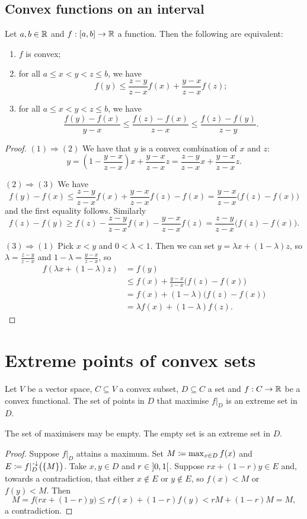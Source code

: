 \subsection{Convex functions on an interval}
\begin{proposition}
Let $a,b\in \mathbb{R}$ and $f: \interval{a,b}\to \R$ a function. Then the following are equivalent:
\begin{enumerate}
\item $f$ is convex;
\item for all $a \leq x<y<z \leq b$, we have
\[ f(y) \leq \frac{z-y}{z-x}f(x) + \frac{y-x}{z-x}f(z); \]
\item for all $a \leq x<y<z \leq b$, we have
\[ \frac{f(y)-f(x)}{y-x} \leq \frac{f(z)-f(x)}{z-x} \leq \frac{f(z)-f(y)}{z-y}. \]
\end{enumerate}
\end{proposition}
\begin{proof}
$(1) \Rightarrow (2)$ We have that $y$ is a convex combination of $x$ and $z$:
\[ y = \left(1 - \frac{y-x}{z-x}\right)x + \frac{y-x}{z-x}z =  \frac{z-y}{z-x}x + \frac{y-x}{z-x}z. \]

$(2) \Rightarrow (3)$ We have
\[ f(y) - f(x) \leq \frac{z-y}{z-x}f(x) + \frac{y-x}{z-x}f(z) - f(x) = \frac{y-x}{z-x}\big(f(z)-f(x)\big) \]
and the first equality follows. Similarly
\[ f(z) - f(y) \geq f(z) - \frac{z-y}{z-x}f(x) - \frac{y-x}{z-x}f(z) = \frac{z-y}{z-x}\big(f(z)-f(x)\big). \]

$(3) \Rightarrow (1)$ Pick $x<y$ and $0<\lambda< 1$. Then we can set $y = \lambda x + (1-\lambda)z$, so $\lambda = \frac{z-y}{z-x}$ and $1-\lambda = \frac{y-x}{z-x}$, so
\begin{align*}
f(\lambda x + (1-\lambda)z) &= f(y) \\
&\leq f(x) + \frac{y-x}{z-x}\big(f(z)-f(x)\big) \\
&= f(x) + (1-\lambda)\big(f(z) - f(x)\big) \\
&= \lambda f(x) + (1-\lambda)f(z).
\end{align*}
\end{proof}

\section{Extreme points of convex sets}

\begin{lemma} \label{extremePointsConvexFunctionExtremePointsDomain}
Let $V$ be a vector space, $C\subseteq V$ a convex subset, $D\subseteq C$ a set and $f: C\to \mathbb{R}$ be a convex functional.
The set of points in $D$ that maximise $f|_D$ is an extreme set in $D$.
\end{lemma}
The set of maximisers may be empty. The empty set is an extreme set in $D$.
\begin{proof}
Suppose $f|_D$ attains a maximum. Set $M \coloneqq \max_{x\in D}f(x)$ and $E \coloneqq f|_D^{{\text{\hspace{0.15em}-}\downarrow}}\big(\{M\}\big)$. Take $x,y\in D$ and $r\in \interval[o]{0,1}$. Suppose $rx + (1-r)y\in E$ and, towards a contradiction, that either $x \notin E$ or $y \notin E$, so $f(x)<M$ or $f(y)<M$. Then
\[ M = f\big(rx + (1-r)y\big) \leq rf(x) + (1-r)f(y) < rM + (1-r)M = M, \]
a contradiction.
\end{proof}


